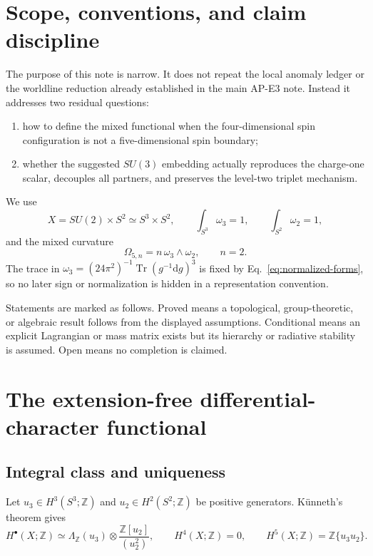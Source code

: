 \documentclass[11pt]{article}
\theoremstyle{definition}
\theoremstyle{remark}
\newcommand{\dd}{\mathrm d}
\newcommand{\ZZ}{\mathbb Z}
\newcommand{\Tr}{\operatorname{Tr}}
\newcommand{\status}[1]{\textcolor{blue!60!black}{\textsf{#1}}}
\begin{document}
\section{Scope, conventions, and claim discipline}

The purpose of this note is narrow.  It does not repeat the local anomaly
ledger or the worldline reduction already established in the main AP-E3
note.  Instead it addresses two residual questions:
\begin{enumerate}[label=(Q\arabic*)]
\item how to define the mixed functional when the four-dimensional spin
  configuration is not a five-dimensional spin boundary;
\item whether the suggested \(SU(3)\) embedding actually reproduces the
  charge-one scalar, decouples all partners, and preserves the level-two
  triplet mechanism.
\end{enumerate}

We use
\begin{equation}
 X=SU(2)\times S^2\simeq S^3\times S^2,
 \qquad
 \int_{S^3}\omega_3=1,
 \qquad
 \int_{S^2}\omega_2=1,
 \label{eq:normalized-forms}
\end{equation}
and the mixed curvature
\begin{equation}
 \Omega_{5,n}=n\,\omega_3\wedge\omega_2,
 \qquad n=2.
 \label{eq:mixed-curvature}
\end{equation}
The trace in
\(\omega_3=(24\pi^2)^{-1}\Tr(g^{-1}\dd g)^3\) is fixed by
Eq.~\eqref{eq:normalized-forms}, so no later sign or normalization is hidden
in a representation convention.

Statements are marked as follows.  \status{Proved} means a topological,
group-theoretic, or algebraic result follows from the displayed assumptions.
\status{Conditional} means an explicit Lagrangian or mass matrix exists but
its hierarchy or radiative stability is assumed.  \status{Open} means no
completion is claimed.

\section{The extension-free differential-character functional}

\subsection{Integral class and uniqueness}

Let \(u_3\in H^3(S^3;\ZZ)\) and
\(u_2\in H^2(S^2;\ZZ)\) be positive generators.  K\"unneth's theorem gives
\begin{equation}
 H^\bullet(X;\ZZ)
 \simeq \Lambda_{\ZZ}(u_3)\otimes
 \frac{\ZZ[u_2]}{(u_2^2)},
 \qquad
 H^4(X;\ZZ)=0,
 \qquad
 H^5(X;\ZZ)=\ZZ\{u_3u_2\}.
 \label{eq:cohomology-ring}
\end{equation}
\end{document}

